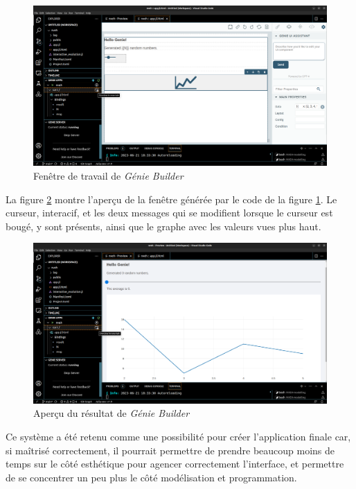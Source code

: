 \documentclass[a4paper, french, 12pt, titlepage]{article}
\begin{document}
\begin{figure}[H]
  \includegraphics[width=\linewidth]{geniebuilder_travail.png}
  \caption{Fenêtre de travail de \emph{Génie Builder}}
  \label{fig:fig6}
\end{figure}

La figure \ref{fig:fig7} montre l'aperçu de la fenêtre générée par le code de la figure \ref{fig:fig6}. 
Le curseur, interacif, et les deux messages qui se modifient lorsque le curseur est bougé, y sont présents, ainsi que le graphe avec les valeurs vues plus haut. \\

\begin{figure}[H]
  \includegraphics[width=\linewidth]{geniebuilder_result.png}
  \caption{Aperçu du résultat de \emph{Génie Builder}}
  \label{fig:fig7}
\end{figure}

Ce système a été retenu comme une possibilité pour créer l'application finale car, si maîtrisé correctement, il pourrait permettre de prendre beaucoup moins de temps sur le côté esthétique pour agencer correctement l'interface, et permettre de se concentrer un peu plus le côté modélisation et programmation.  \\
\end{document}
